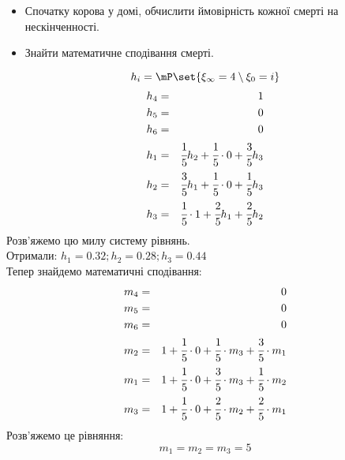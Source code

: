 \begin{tsk}
\begin{center}
\end{center}
\begin{itemize}
\item Спочатку корова у домі, обчислити ймовірність кожної смерті на нескінченності.
\item Знайти математичне сподівання смерті.
\end{itemize}
\begin{equation}
h_i = \mP\set{\xi_\infty=4\setminus\xi_0=i}
\end{equation}
\begin{eqnarray}
h_4 &=& 1\\
h_5 &=& 0\\
h_6 &=& 0\\
h_1 &=& \cfrac15 h_2 + \cfrac15 \cdot 0 + \cfrac35 h_3\\
h_2 &=& \cfrac35 h_1 + \cfrac15 \cdot 0 + \cfrac15 h_3 \\
h_3 &=& \cfrac15 \cdot 1 + \cfrac25 h_1 + \cfrac25 h_2
\end{eqnarray}
Розв’яжемо цю милу систему рівнянь.\\
Отримали: $h_1 = 0.32;h_2 = 0.28;h_3 = 0.44$\\
Тепер знайдемо математичні сподівання:
\begin{eqnarray}
m_4 &=& 0\\
m_5 &=& 0\\
m_6 &=& 0\\
m_2 &=& 1 + \cfrac15\cdot 0 +\cfrac15 \cdot m_3 + \cfrac35 \cdot m_1\\
m_1 &=& 1+ \cfrac15 \cdot 0 + \cfrac35 \cdot m_3 +  \cfrac15 \cdot m_2\\
m_3 &=& 1 + \cfrac15 \cdot 0 + \cfrac25 \cdot m_2 + \cfrac25 \cdot m_1
\end{eqnarray}
Розв’яжемо це рівняння:
\begin{equation}
m_1 = m_2 = m_3 = 5
\end{equation}
\end{tsk}